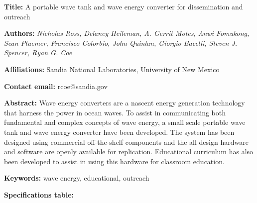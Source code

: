 \documentclass[11pt, letterpaper]{article}
\begin{document}
\begin{flushleft}


\setlength{\parindent}{0pt}
\setlength{\parskip}{10pt}

\textbf{Title:} A portable wave tank and wave energy converter for dissemination and outreach

\textbf{Authors:} \textit{Nicholas Ross, Delaney Heileman, A. Gerrit Motes, Anwi Fomukong, Sean Pluemer, Francisco Colorbio, John Quinlan, Giorgio Bacelli, Steven J. Spencer, Ryan G. Coe}

\textbf{Affiliations:} Sandia National Laboratories, University of New Mexico

\textbf{Contact email:} rcoe@sandia.gov

\textbf{Abstract:} Wave energy converters are a nascent energy generation technology that harness the power in ocean waves.
To assist in communicating both fundamental and complex concepts of wave energy, a small scale portable wave tank and wave energy converter have been developed.
The system has been designed using commercial off-the-shelf components and the all design hardware and software are openly available for replication.
Educational curriculum has also been developed to assist in using this hardware for classroom education.

\textbf{Keywords:} wave energy, educational, outreach

\textbf{Specifications table:}


\end{flushleft}
\end{document}

